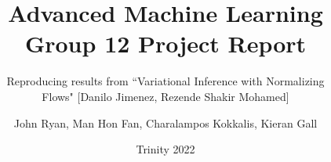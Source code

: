 \documentclass[12pt]{ociamthesis}
\title{Advanced Machine Learning \\
        Group 12 Project Report}
\subtitle{Reproducing results from ``Variational Inference with Normalizing \\[1ex] Flows" [Danilo Jimenez, Rezende Shakir Mohamed]}
\author{John Ryan, Man Hon Fan, Charalampos Kokkalis, Kieran Gall}
\date{Trinity 2022}
\begin{document}
\setcounter{tocdepth}{3}


\maketitle

\begin{romanpages}
\tableofcontents
\end{romanpages}


     





\renewcommand{\bibname}{References}
\nocite{*}

\end{document}
